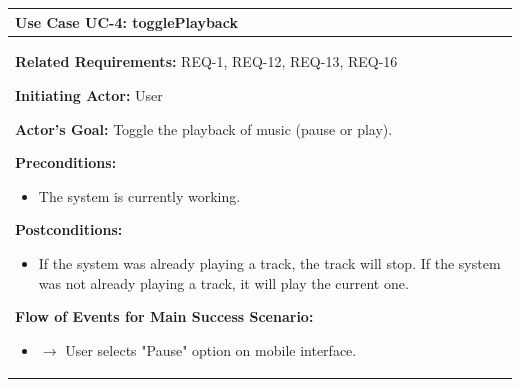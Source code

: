 \documentclass[letterpaper,english, 12pt]{scrreprt}
\begin{document}
\begin{center}
        \begin{tabular}{|C{15cm}|}
                \hline
                        \textbf{Use Case UC-4: togglePlayback}\\
                \hline
                        \begin{flushleft}
                                \textbf{Related Requirements: } REQ-1, REQ-12, REQ-13, REQ-16
                        \end{flushleft}
                        \begin{flushleft}
                                \textbf{Initiating Actor: } User
                        \end{flushleft}
                        \begin{flushleft}
                                \textbf{Actor's Goal: } Toggle the playback of music (pause or play).
                        \end{flushleft}
                        \begin{flushleft}
                                \textbf{Preconditions: }
                        \end{flushleft}
                                \begin{itemize}
                                        \item The system is currently working.
                                \end{itemize}
                        \begin{flushleft}
                                \textbf{Postconditions: }
                        \end{flushleft}
                                \begin{itemize}
                                        \item If the system was already playing a track, the track will stop. If the system was not already playing a track, it will play the current one.
                                \end{itemize}
                        \begin{flushleft}
                                \textbf{Flow of Events for Main Success Scenario: }
                        \end{flushleft}
                                \begin{itemize}
                                        \item $\rightarrow$ User selects "Pause" option on mobile interface.

\end{itemize}
\end{tabular}
\end{center}
\end{document}
